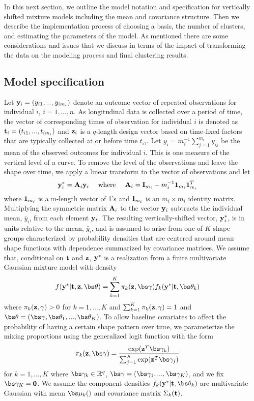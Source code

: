 In this next section, we outline the model notation and specification for vertically shifted mixture models including the mean and covariance structure. Then we describe the implementation process of choosing a basis, the number of clusters, and estimating the parameters of the model. As mentioned there are some considerations and issues that we discuss in terms of the impact of transforming the data on the modeling process and final clustering results. 
\subsection{Model specification}
 Let $\mathbf y_{i}=(y_{i1},...,y_{im_{i}})$ denote an outcome vector of repeated observations for individual $i$, $i=1,...,n$. As longitudinal data is collected over a period of time, the vector of corresponding times of observation for individual $i$ is denoted as $\mathbf t_{i}=(t_{i1},...,t_{im_{i}})$ and $\mathbf z_{i}$ is a $q$-length design vector based on time-fixed factors that are typically collected at or before time $t_{i1}$. Let $\bar{y}_{i}= m_{i}^{-1}\sum^{m_{i}}_{j=1} y_{ij}$ be the mean of the observed outcomes for individual $i$. This is one measure of the vertical level of a curve. To remove the level of the observations and leave the shape over time, we apply a linear transform to the vector of observations and let
\begin{align*}
\mathbf y^{*}_{i} = \mathbf A_{i}\mathbf y_{i}\quad\text{ where }\quad \mathbf A_{i} =\mathbf I_{m_{i}} - m_{i}^{-1}\mathbf 1_{m_{i}}\mathbf 1_{m_{i}}^{T}
\end{align*}
where $\mathbf 1_{m_{i}}$ is a m-length vector of 1's and $\mathbf I_{m_{i}}$ is an $m_{i}\times m_{i}$ identity matrix. Multiplying the symmetric matrix $\mathbf A_{i}$ to the vector $\mathbf y_{i}$ subtracts the individual mean, $\bar{y}_{i}$, from each element $\mathbf y_{i}$. The resulting vertically-shifted vector, $\mathbf y^{*}_{i}$, is in units relative to the mean, $\bar{y}_{i}$, and is assumed to arise from one of $K$ shape groups characterized by probability densities that are centered around mean shape functions with dependence summarized by covariance matrices. We assume that, conditional on $\mathbf t$ and $\mathbf z$, $\mathbf y^{*}$ is a realization from a finite multivariate Gaussian mixture model with density
\begin{align*}
 f(\B y^{*}|\B t,\B z,\bs\theta) =  \sum^{K}_{k=1}\pi_{k}(\B z, \bs\gamma)f_{k}( \B y^{*}|\B t,\bs\theta_{k})
\end{align*}
where $\pi_{k}(\mathbf z,\gamma)>0$ for $k=1,...,K$ and $\sum^{K}_{k=1}\pi_{k}(\mathbf z,\gamma)=1$ and $\bs\theta = (\bs\gamma,\bs\theta_{1},...,\bs\theta_{K})$. To allow baseline covariates to affect the probability of having a certain shape pattern over time, we parameterize the mixing proportions using the generalized logit function with the form
$$\pi_{k}(\B z,\bs\gamma)=\frac{\exp(\B z^{T}\bs\gamma_{k})}{\sum_{j=1}^{K}\exp(\B z^{T}\bs\gamma_{j})}$$ 
for $k=1,...,K$ where $\bs \gamma_{k}\in\mathbb{R}^{q}$, $\bs\gamma = (\bs\gamma_{1},...,\bs\gamma_{K})$, and we fix $\bs\gamma_{K}=\B 0$. We assume the component densities $f_{k}(\B y^{*}|\B t,\bs\theta_{k})$ are multivariate Gaussian with mean $\bs\mu_{k}(\B )$ and covariance matrix $\Sigma_{k}(\mathbf t)$.

